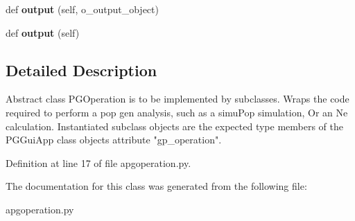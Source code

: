 \begin{DoxyCompactItemize}
\item 
def {\bfseries output} (self, o\+\_\+output\+\_\+object)\hypertarget{classnegui_1_1apgoperation_1_1APGOperation_a92751ec3a6053de0e8638df3d1b122ff}{}\label{classnegui_1_1apgoperation_1_1APGOperation_a92751ec3a6053de0e8638df3d1b122ff}

\item 
def {\bfseries output} (self)\hypertarget{classnegui_1_1apgoperation_1_1APGOperation_a70a4663961a30ab0405701072c78f759}{}\label{classnegui_1_1apgoperation_1_1APGOperation_a70a4663961a30ab0405701072c78f759}

\end{DoxyCompactItemize}


\subsection{Detailed Description}
\begin{DoxyVerb}Abstract class PGOperation is to be implemented by subclasses.
Wraps the code required to perform a pop gen analysis, such as a simuPop simulation,
Or an Ne calculation.  Instantiated subclass objects are the expected type members 
of the PGGuiApp class objects attribute "gp_operation".
\end{DoxyVerb}
 

Definition at line 17 of file apgoperation.\+py.



The documentation for this class was generated from the following file\+:\begin{DoxyCompactItemize}
\item 
apgoperation.\+py\end{DoxyCompactItemize}
